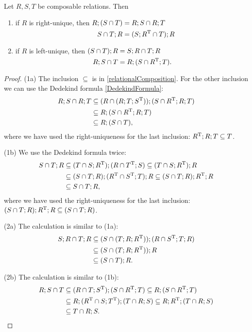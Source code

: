 \begin{lemma}
Let $R,S, T$ be composable relations. Then
\begin{enumerate}
\item if $R$ is right-unique, then $\begin{aligned}[t]
R;(S\cap T) &= R;S \cap R;T\\
S\cap T;R &= (S;R^{\mathrm{T}} \cap T);R
\end{aligned}$
\item if $R$ is left-unique, then $\begin{aligned}[t]
(S\cap T);R &= S;R \cap T;R \\
R;S\cap T &= R;(S\cap R^{\mathrm{T}};T) .
\end{aligned}$
\end{enumerate}
\end{lemma}
\begin{proof}
(1a) The inclusion $\subseteq$ is in \ref{relationalComposition}. For the other inclusion we can use the Dedekind formula \ref{DedekindFormula}:
\begin{align*}
R;S \cap R;T &\subseteq (R\cap (R;T;S^{\mathrm{T}}));(S\cap R^{\mathrm{T}};R;T) \\
&\subseteq R;(S\cap R^{\mathrm{T}};R;T) \\
&\subseteq R;(S\cap T),
\end{align*}
where we have used the right-uniqueness for the last inclusion: $R^{\mathrm{T}};R;T \subseteq T$.

(1b) We use the Dedekind formula twice:
\begin{align*}
S\cap T;R &\subseteq (T\cap S;R^{\mathrm{T}});(R\cap T^{\mathrm{T}};S) \subseteq (T\cap S;R^{\mathrm{T}});R \\
&\subseteq (S\cap T;R);(R^{\mathrm{T}}\cap S^{\mathrm{T}};T);R \subseteq (S\cap T;R);R^{\mathrm{T}};R \\
&\subseteq S\cap T;R,
\end{align*}
where we have used the right-uniqueness for the last inclusion: $(S\cap T;R);R^{\mathrm{T}};R \subseteq (S\cap T;R)$.

(2a) The calculation is similar to (1a):
\begin{align*}
S;R \cap T;R &\subseteq (S\cap (T;R;R^{\mathrm{T}}));(R\cap S^{\mathrm{T}};T;R) \\
&\subseteq (S\cap (T;R;R^{\mathrm{T}}));R \\
&\subseteq (S\cap T);R.
\end{align*}

(2b) The calculation is similar to (1b):
\begin{align*}
R;S\cap T &\subseteq (R\cap T;S^{\mathrm{T}});(S\cap R^{\mathrm{T}};T) \subseteq R;(S\cap R^{\mathrm{T}};T) \\
&\subseteq R;(R^{\mathrm{T}}\cap S;T^{\mathrm{T}});(T\cap R;S) \subseteq R;R^{\mathrm{T}};(T\cap R;S) \\
&\subseteq T\cap R;S.
\end{align*}
\end{proof}


